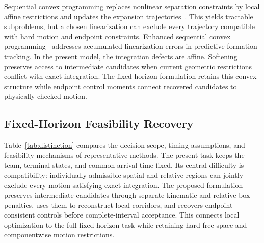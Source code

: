 Sequential convex programming replaces nonlinear separation constraints by local affine restrictions and updates the expansion trajectories~\cite{augugliaro2012}. This yields tractable subproblems, but a chosen linearization can exclude every trajectory compatible with hard motion and endpoint constraints. Enhanced sequential convex programming~\cite{liu2025escp} addresses accumulated linearization errors in predictive formation tracking. In the present model, the integration defects are affine. Softening preserves access to intermediate candidates when current geometric restrictions conflict with exact integration. The fixed-horizon formulation retains this convex structure while endpoint control moments connect recovered candidates to physically checked motion.

\subsection{Fixed-Horizon Feasibility Recovery}
Table~\ref{tab:distinction} compares the decision scope, timing assumptions, and feasibility mechanisms of representative methods. The present task keeps the team, terminal states, and common arrival time fixed. Its central difficulty is compatibility: individually admissible spatial and relative regions can jointly exclude every motion satisfying exact integration. The proposed formulation preserves intermediate candidates through separate kinematic and relative-box penalties, uses them to reconstruct local corridors, and recovers endpoint-consistent controls before complete-interval acceptance. This connects local optimization to the full fixed-horizon task while retaining hard free-space and componentwise motion restrictions.


